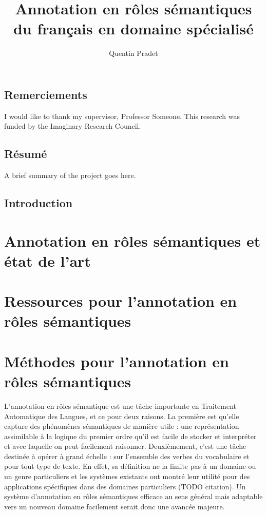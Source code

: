 \documentclass[oneside,parskip]{scrbook}
\title{Annotation en rôles sémantiques du français en domaine spécialisé}
\author{Quentin Pradet}
\date{}
\begin{document}
\maketitle

\frontmatter
\tableofcontents
\listoffigures
\listoftables

\chapter{Remerciements}

I would like to thank my supervisor, Professor Someone. This
research was funded by the Imaginary Research Council.

\chapter{Résumé}

A brief summary of the project goes here.


\mainmatter

\chapter{Introduction}
\label{ch:intro}

\part{Annotation en rôles sémantiques et état de l'art}





\part{Ressources pour l'annotation en rôles sémantiques}





\part{Méthodes pour l'annotation en rôles sémantiques}

L'annotation en rôles sémantique est une tâche importante en Traitement
Automatique des Langues, et ce pour deux raisons. La première est qu'elle
capture des phénomènes sémantiques de manière utile : une représentation
assimilable à la logique du premier ordre qu'il est facile de stocker et
interpréter et avec laquelle on peut facilement raisonner. Deuxièmement, c'est
une tâche destinée à opérer à grand échelle : sur l'ensemble des verbes du
vocabulaire et pour tout type de texte. En effet, sa définition ne la limite
pas à un domaine ou un genre particuliers et les systèmes existants ont montré
leur utilité pour des applications spécifiques dans des domaines particuliers
(TODO citation). Un système d'annotation en rôles sémantiques efficace au sens
général mais adaptable vers un nouveau domaine facilement serait donc une
avancée majeure.
\end{document}
